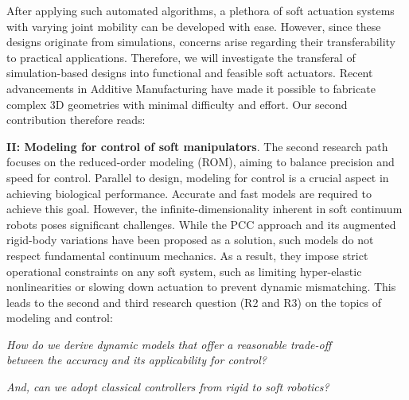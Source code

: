  After applying such automated algorithms, a plethora of soft actuation systems with varying joint mobility can be developed with ease. However, since these designs originate from simulations, concerns arise regarding their transferability to practical applications. Therefore, we will investigate the transferal of simulation-based designs into functional and feasible soft actuators. Recent advancements in Additive Manufacturing have made it possible to fabricate complex 3D geometries with minimal difficulty and effort. Our second contribution therefore reads:


\textbf{II: Modeling for control of soft manipulators}. The second research path focuses on the reduced-order modeling (ROM), aiming to balance precision and speed for control. Parallel to design, modeling for control is a crucial aspect in achieving biological performance. Accurate and fast models are required to achieve this goal. However, the infinite-dimensionality inherent in soft continuum robots poses significant challenges. While the PCC approach and its augmented rigid-body variations have been proposed as a solution, such models do not respect fundamental continuum mechanics. As a result, they impose strict operational constraints on any soft system, such as limiting hyper-elastic nonlinearities or slowing down actuation to prevent dynamic mismatching. This leads to the second and third research question (R2 and R3) on the topics of modeling and control: %
%
\begin{center}
\textit{
How do we derive dynamic models that offer a reasonable trade-off \\ between the accuracy and its applicability for control? }
\end{center}
\begin{center}
\textit{And, can we adopt classical controllers from rigid to soft robotics?}
\end{center}
%
